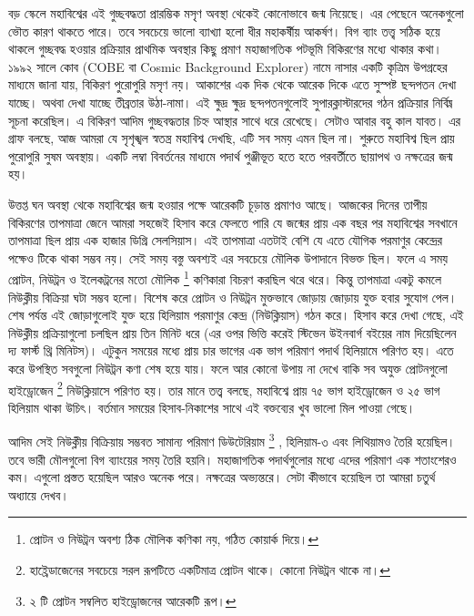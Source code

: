 \documentclass[
]{book}
\begin{document}
বড় স্কেলে মহাবিশ্বের এই গুচ্ছবদ্ধতা প্রারম্ভিক মসৃণ অবস্থা থেকেই কোনোভাবে জন্ম নিয়েছে। এর পেছেনে অনেকগুলো ভৌত কারণ থাকতে পারে। তবে সবচেয়ে ভালো ব্যাখ্যা হলো ধীর মহাকর্ষীয় আকর্ষণ। বিগ ব্যাং তত্ত্ব সঠিক হয়ে থাকলে গুচ্ছবদ্ধ হওয়ার প্রক্রিয়ার প্রাথমিক অবস্থার কিছু প্রমাণ মহাজাগতিক পটভূমি বিকিরণের মধ্যে থাকার কথা। ১৯৯২ সালে কোব (COBE বা Cosmic Background Explorer) নামে নাসার একটি কৃত্রিম উপগ্রহের মাধ্যমে জানা যায়, বিকিরণ পুরোপুরি মসৃণ নয়। আকাশের এক দিক থেকে আরেক দিকে এতে সুস্পষ্ট ছন্দপতন দেখা যাচ্ছে। অথবা দেখা যাচ্ছে তীব্রতার উঠা-নামা। এই ক্ষুদ্র ক্ষুদ্র ছন্দপতনগুলোই সুপারক্লাস্টারদের গঠন প্রক্রিয়ার নির্বিঘ্ন সূচনা করেছিল। এ বিকিরণ আদিম গুচ্ছবদ্ধতার চিহ্ন আস্থার সাথে ধরে রেখেছে। সেটাও আবার বহু কাল যাবত। এর গ্রাফ বলছে, আজ আমরা যে সৃশৃঙ্খল স্বতন্ত্র মহাবিশ্ব দেখছি, এটি সব সময় এমন ছিল না। শুরুতে মহাবিশ্ব ছিল প্রায় পুরোপুরি সুষম অবস্থায়। একটি লম্বা বিবর্তনের মাধ্যমে পদার্থ পুঞ্জীভূত হতে হতে পরবর্তীতে ছায়াপথ ও নক্ষত্রের জন্ম হয়।

উত্তপ্ত ঘন অবস্থা থেকে মহাবিশ্বের জন্ম হওয়ার পক্ষে আরেকটি চূড়ান্ত প্রমাণও আছে। আজকের দিনের তাপীয় বিকিরণের তাপমাত্রা জেনে আমরা সহজেই হিসাব করে ফেলতে পারি যে জন্মের প্রায় এক বছর পর মহাবিশ্বের সবখানে তাপমাত্রা ছিল প্রায় এক হাজার ডিগ্রি সেলসিয়াস। এই তাপমাত্রা এতটাই বেশি যে এতে যৌগিক পরমাণুর কেন্দ্রের পক্ষেও টিকে থাকা সম্ভব নয়। সেই সময় বস্তু অবশ্যই এর সবচেয়ে মৌলিক উপাদানে বিভক্ত ছিল। ফলে এ সময় প্রোটন, নিউট্রন ও ইলেকট্রনের মতো মৌলিক \footnote{প্রোটন ও নিউট্রন অবশ্য ঠিক মৌলিক কণিকা নয়, গঠিত কোয়ার্ক দিয়ে।} কণিকারা বিচরণ করছিল থরে থরে। কিন্তু তাপমাত্রা একটু কমলে নিউক্লীয় বিক্রিয়া ঘটা সম্ভব হলো। বিশেষ করে প্রোটন ও নিউট্রন মুক্তভাবে জোড়ায় জোড়ায় যুক্ত হবার সুযোগ পেল। শেষ পর্যন্ত এই জোড়াগুলোই যুক্ত হয়ে হিলিয়াম পরমাণুর কেন্দ্র (নিউক্লিয়াস) গঠন করে। হিসাব করে দেখা গেছে, এই নিউক্লীয় প্রক্রিয়াগুলো চলছিল প্রায় তিন মিনিট ধরে (এর ওপর ভিত্তি করেই স্টিভেন উইনবার্গ বইয়ের নাম দিয়েছিলেন দ্য ফার্স্ট থ্রি মিনিটস)। এটুকুন সময়ের মধ্যে প্রায় চার ভাগের এক ভাগ পরিমাণ পদার্থ হিলিয়ামে পরিণত হয়। এতে করে উপস্থিত সবগুলো নিউট্রন কণা শেষ হয়ে যায়। ফলে আর কোনো উপায় না দেখে বাকি সব অযুক্ত প্রোটনগুলো হাইড্রোজেন \footnote{হাই্রেডাজেনের সবচেয়ে সরল রূপটিতে একটিমাত্র প্রোটন থাকে। কোনো নিউট্রন থাকে না।} নিউক্লিয়াসে পরিণত হয়। তার মানে তত্ত্ব বলছে, মহাবিশ্বে প্রায় ৭৫ ভাগ হাইড্রোজেন ও ২৫ ভাগ হিলিয়াম থাকা উচিৎ। বর্তমান সময়ের হিসাব-নিকাশের সাথে এই বক্তব্যের খুব ভালো মিল পাওয়া গেছে।

আদিম সেই নিউক্লীয় বিক্রিয়ায় সম্ভবত সামান্য পরিমাণ ডিউটেরিয়াম \footnote{২ টি প্রোটন সম্বলিত হাইড্রোজনের আরেকটি রূপ।} , হিলিয়াম-৩ এবং লিথিয়ামও তৈরি হয়েছিল। তবে ভারী মৌলগুলো বিগ ব্যাংয়ের সময় তৈরি হয়নি। মহাজাগতিক পদার্থগুলোর মধ্যে এদের পরিমাণ এক শতাংশেরও কম। এগুলো প্রস্তত হয়েছিল আরও অনেক পরে। নক্ষত্রের অভ্যন্তরে। সেটা কীভাবে হয়েছিল তা আমরা চতুর্থ অধ্যায়ে দেখব।
\end{document}
